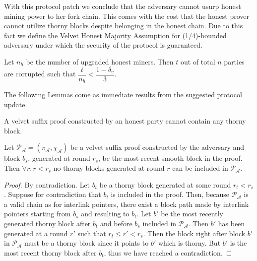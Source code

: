 With this protocol patch we conclude that the adversary cannot usurp honest mining power to her fork chain. This comes with the cost that the honest prover cannot utilize thorny blocks despite belonging in the honest chain. Due to this fact we define the Velvet Honest Majority Assumption for (1/4)-bounded adversary under which the security of the protocol is guaranteed.

\begin{definition}
	Let $n_h$ be the number of upgraded honest miners. Then $t$ out of total $n$ parties are corrupted such that $\dfrac{t}{n_h} < \dfrac{1 - \delta_v}{3} $.
	\label{defn:velvet_honest_majority}
\end{definition}

The following Lemmas come as immediate results from the suggested protocol
update.

\begin{lemma}
	A velvet suffix proof constructed by an honest party cannot contain any thorny block.
	\label{lemm:smooth_honest_suffix}
\end{lemma}

\begin{lemma}
	Let $\mathcal{P_A} = (\pi_\mathcal{A}, \chi_\mathcal{A})$ be a velvet suffix proof constructed by the adversary and block $b_s$, generated at round $r_s$, be the most recent smooth block in the proof. Then $\forall r:r < r_s$ no thorny blocks generated at round $r$ can be included in $\mathcal{P_A}$.
	\label{lemm:smooths_before_smooth}
\end{lemma}
\begin{proof}
By contradiction. Let $b_t$ be a thorny block generated at some round $r_t < r_s$. Suppose for contradiction that $b_t$ is included in the proof. Then, because $\mathcal{P_A}$ is a valid chain as for interlink pointers, there exist a block path made by interlink pointers starting from $b_s$ and resulting to $b_t$. Let $b'$ be the most recently generated thorny block after $b_t$ and before $b_s$ included in $\mathcal{P_A}$. Then $b'$ has been generated at a round $r'$ such that $r_t \leq r' < r_s$. Then the block right after block $b'$ in $\mathcal{P_A}$ must be a thorny block since it points to $b'$ which is thorny. But $b'$ is the most recent thorny block after $b_t$, thus we have reached a contradiction.
\end{proof}

